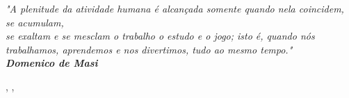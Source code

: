 \begin{epigrafe}[]
    \vspace*{\fill}
	\begin{flushright}
	
		\textit{"A plenitude da atividade humana é alcançada somente quando nela coincidem, se acumulam,\\ se exaltam e se mesclam o trabalho o estudo e o jogo; isto é,  quando nós \\ trabalhamos, aprendemos e nos divertimos, tudo ao mesmo tempo."\\
				\textbf{Domenico de Masi}}
		
	\end{flushright}
\end{epigrafe}

, ,  
